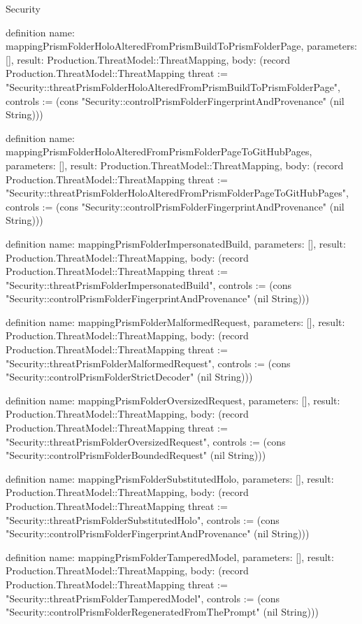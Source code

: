 \begin{lexlean}{Security}
\begin{semanticmodule}
definition{
  name: mappingPrismFolderHoloAlteredFromPrismBuildToPrismFolderPage,
  parameters: [],
  result: Production.ThreatModel::ThreatMapping,
  body: (record Production.ThreatModel::ThreatMapping {threat := "Security::threatPrismFolderHoloAlteredFromPrismBuildToPrismFolderPage", controls := (cons "Security::controlPrismFolderFingerprintAndProvenance" (nil String))})
}

definition{
  name: mappingPrismFolderHoloAlteredFromPrismFolderPageToGitHubPages,
  parameters: [],
  result: Production.ThreatModel::ThreatMapping,
  body: (record Production.ThreatModel::ThreatMapping {threat := "Security::threatPrismFolderHoloAlteredFromPrismFolderPageToGitHubPages", controls := (cons "Security::controlPrismFolderFingerprintAndProvenance" (nil String))})
}

definition{
  name: mappingPrismFolderImpersonatedBuild,
  parameters: [],
  result: Production.ThreatModel::ThreatMapping,
  body: (record Production.ThreatModel::ThreatMapping {threat := "Security::threatPrismFolderImpersonatedBuild", controls := (cons "Security::controlPrismFolderFingerprintAndProvenance" (nil String))})
}

definition{
  name: mappingPrismFolderMalformedRequest,
  parameters: [],
  result: Production.ThreatModel::ThreatMapping,
  body: (record Production.ThreatModel::ThreatMapping {threat := "Security::threatPrismFolderMalformedRequest", controls := (cons "Security::controlPrismFolderStrictDecoder" (nil String))})
}

definition{
  name: mappingPrismFolderOversizedRequest,
  parameters: [],
  result: Production.ThreatModel::ThreatMapping,
  body: (record Production.ThreatModel::ThreatMapping {threat := "Security::threatPrismFolderOversizedRequest", controls := (cons "Security::controlPrismFolderBoundedRequest" (nil String))})
}

definition{
  name: mappingPrismFolderSubstitutedHolo,
  parameters: [],
  result: Production.ThreatModel::ThreatMapping,
  body: (record Production.ThreatModel::ThreatMapping {threat := "Security::threatPrismFolderSubstitutedHolo", controls := (cons "Security::controlPrismFolderFingerprintAndProvenance" (nil String))})
}

definition{
  name: mappingPrismFolderTamperedModel,
  parameters: [],
  result: Production.ThreatModel::ThreatMapping,
  body: (record Production.ThreatModel::ThreatMapping {threat := "Security::threatPrismFolderTamperedModel", controls := (cons "Security::controlPrismFolderRegeneratedFromThePrompt" (nil String))})
}


\end{semanticmodule}
\end{lexlean}
